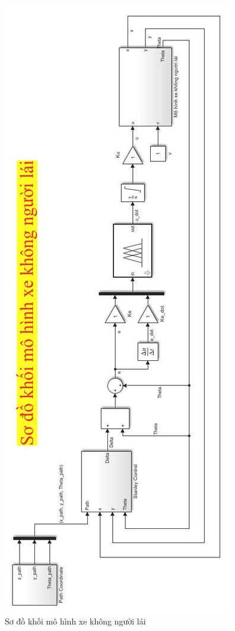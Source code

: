 \documentclass[a4paper, 12pt]{article}
\begin{document}
	\begin{center}
		\begin{figure}[H]
			\begin{center}
				\includegraphics[scale=.7]{images/SoDoKhoiTong_Ngang}
			\end{center}
			\caption{Sơ đồ khối mô hình xe không người lái}
			\label{refhinh1}
		\end{figure}
	\end{center}
	
\end{document}
